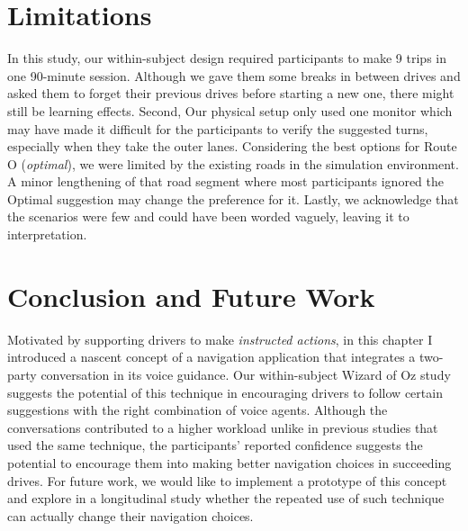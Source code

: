 \section{Limitations}
In this study, our within-subject design required participants to make 9 trips in one 90-minute session. Although we gave them some breaks in between drives and asked them to forget their previous drives before starting a new one, there might still be learning effects. Second, Our physical setup only used one monitor which may have made it difficult for the participants to verify the suggested turns, especially when they take the outer lanes. Considering the best options for Route O (\textit{optimal}), we were limited by the existing roads in the simulation environment. A minor lengthening of that road segment where most participants ignored the Optimal suggestion may change the preference for it. Lastly, we acknowledge that the scenarios were few and could have been worded vaguely, leaving it to interpretation.

\section{Conclusion and Future Work}
Motivated by supporting drivers to make \textit{instructed actions}, in this chapter I introduced a nascent concept of a navigation application that integrates a two-party conversation in its voice guidance. Our within-subject Wizard of Oz study suggests the potential of this technique in encouraging drivers to follow certain suggestions with the right combination of voice agents. Although the conversations contributed to a higher workload unlike in previous studies that used the same technique, the participants' reported confidence suggests the potential to encourage them into making better navigation choices in succeeding drives. For future work, we would like to implement a prototype of this concept and explore in a longitudinal study whether the repeated use of such technique can actually change their navigation choices. 